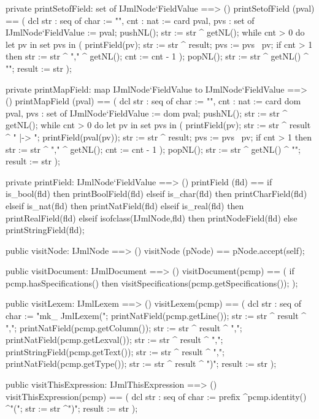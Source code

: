 \begin{vdm_al}
  private printSetofField: set of IJmlNode`FieldValue ==> ()
  printSetofField (pval) ==
    ( dcl str : seq of char := "{", cnt : nat := card pval,
          pvs : set of IJmlNode`FieldValue := pval;
      pushNL();
      str := str ^ getNL();
      while cnt > 0 do
        let pv in set pvs in
          ( printField(pv);
            str := str ^ result;
            pvs := pvs \ {pv};
            if cnt > 1
            then str := str ^ "," ^ getNL();
            cnt := cnt - 1 ); 
      popNL();
      str := str ^ getNL() ^ "}";
      result := str );

  private printMapField: map IJmlNode`FieldValue to IJmlNode`FieldValue ==> ()
  printMapField (pval) == 
    ( dcl str : seq of char := "{", cnt : nat := card dom pval,
          pvs : set of IJmlNode`FieldValue := dom pval;
      pushNL();
      str := str ^ getNL();
      while cnt > 0 do
        let pv in set pvs in
          ( printField(pv);
            str := str ^ result ^ " |-> ";
            printField(pval(pv));
            str := str ^ result;
            pvs := pvs \ {pv};
            if cnt > 1
            then str := str ^ "," ^ getNL();
            cnt := cnt - 1 ); 
      popNL();
      str := str ^ getNL() ^ "}";
      result := str );

  private printField: IJmlNode`FieldValue ==> ()
  printField (fld) ==
    if is_bool(fld) then printBoolField(fld)
    elseif is_char(fld) then printCharField(fld)
    elseif is_nat(fld) then printNatField(fld)
    elseif is_real(fld) then printRealField(fld)
    elseif isofclass(IJmlNode,fld) then printNodeField(fld)
    else printStringField(fld);

  public visitNode: IJmlNode ==> ()
  visitNode (pNode) == pNode.accept(self);

  public visitDocument: IJmlDocument ==> ()
  visitDocument(pcmp) ==
    ( 
      if pcmp.hasSpecifications() then visitSpecifications(pcmp.getSpecifications());
    );

  public visitLexem: IJmlLexem ==> ()
  visitLexem(pcmp) ==
    ( dcl str : seq of char := "mk_ JmlLexem(";
      printNatField(pcmp.getLine());
      str := str ^ result ^ ",";
      printNatField(pcmp.getColumn());
      str := str ^ result ^ ",";
      printNatField(pcmp.getLexval());
      str := str ^ result ^ ",";
      printStringField(pcmp.getText());
      str := str ^ result ^ ",";
      printNatField(pcmp.getType());
      str := str ^ result ^ ")";
      result := str );

  public visitThisExpression: IJmlThisExpression ==> ()
  visitThisExpression(pcmp) ==
    ( dcl str : seq of char := prefix ^pcmp.identity() ^"(";
      str := str ^")";
      result := str );


\end{vdm_al}
